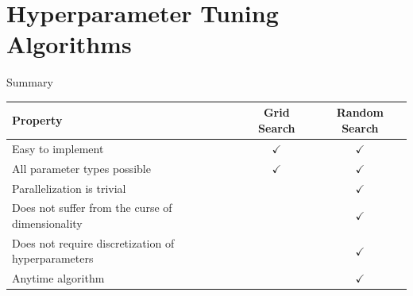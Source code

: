 \documentclass[11pt,compress,t,notes=noshow, aspectratio=169, xcolor=table]{beamer}
\begin{document}
\begin{frame}{}
    
\end{frame}

\section{Hyperparameter Tuning Algorithms}

\begin{frame}{}
    
\end{frame}

\begin{frame}{}
    
\end{frame}

\begin{frame}{}
    
\end{frame}

\begin{frame}{}
    
\end{frame}

\begin{frame}{Summary}
    \begin{table}[]
        \centering
        \begin{tabular}{l|cc}
            Property & Grid Search & Random Search \\
            \midrule
            Easy to implement & $\checkmark$ & $\checkmark$ \\
            All parameter types possible & $\checkmark$ & $\checkmark$ \\
            Parallelization is trivial & & $\checkmark$ \\
            Does not suffer from the curse of dimensionality & & $\checkmark$ \\
            Does not require discretization of hyperparameters & & $\checkmark$ \\
            Anytime algorithm & & $\checkmark$
        \end{tabular}
    \end{table}
\end{frame}
\end{document}
